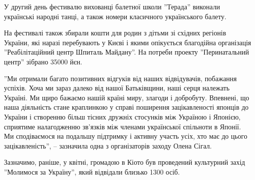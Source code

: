 \documentclass[10pt,a4paper]{article}
\begin{document}
\begin{multicols}{3}
У другий день фестивалю вихованці балетної школи ''Терада'' виконали українські народні танці, а також номери класичного українського балету.

На фестивалі також збирали кошти для родин з дітьми зі східних регіонів України, які наразі перебувають у Києві і якими опікується благодійна організація ''Реабілітаційний центр Шпиталь Майдану''. На потреби проекту ''Перинатальний центр'' зібрано 35000 йєн.

''Ми отримали багато позитивних відгуків від наших відвідувачів, побажання успіхів. Хоча ми зараз далеко від нашої Батьківщини, наші серця належать Україні. Ми щиро бажаємо нашій країні миру, злагоди і добробуту. Впевнені, що наша діяльність стане краплинкою у справі поширення зацікавленості японців до України і створенню більш тісних дружніх стосунків між Україною і Японією, сприятиме налагодженню зв’язків між членами української спільноти в Японії. Ми сподіваємося на подальшу підтримку і активну участь усіх, хто має до цього зацікавленість'', – зазначила одна з організаторів заходу Олена Сігал.

Зазначимо, раніше, у квітні, громадою в Кіото був проведений культурний захід ''Молимося за Україну'', який відвідали близько 1300 осіб.

\end{multicols}

\newpage
\end{document}
